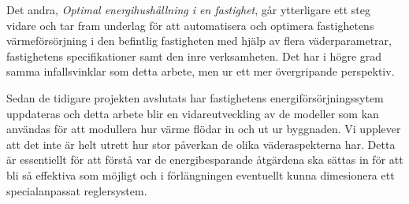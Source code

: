 Det andra, \textit{Optimal energihushållning i en fastighet}\cite{kandidatarbete2010}, går ytterligare ett steg vidare och tar fram underlag för att automatisera och optimera fastighetens värmeförsörjning i den befintlig fastigheten med hjälp av flera väderparametrar, fastighetens specifikationer samt den inre verksamheten. Det har i högre grad samma infallsvinklar som detta arbete, men ur ett mer övergripande perspektiv.

Sedan de tidigare projekten avslutats har fastighetens energiförsörjningssytem uppdateras och detta arbete blir en vidareutveckling av de modeller som kan användas för att modullera hur värme flödar in och ut ur byggnaden. Vi upplever att det inte är helt utrett hur stor påverkan de olika väderaspekterna har. Detta är essentiellt för att förstå var de energibesparande åtgärdena ska sättas in för att bli så effektiva som möjligt och i förlängningen eventuellt kunna dimesionera ett specialanpassat reglersystem.







